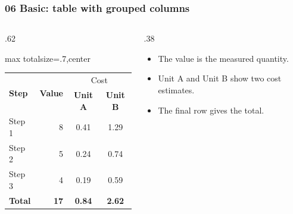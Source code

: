 \begin{frame}
    \frametitle{06 Basic: table with grouped columns}

    \begin{columns}[T]
        \begin{column}{.62\textwidth}
            \begin{adjustbox}{max totalsize={\textwidth}{.7\textheight},center}
                \begin{tabular}{l r cc}
                    \toprule
                    \multirow{2}{*}{\textbf{\alert{Step}}}
                        & \multirow{2}{*}{\textbf{\alert{Value}}}
                        & \multicolumn{2}{c}{\alert{Cost}} \\
                    & & \textbf{\alert{Unit A}} & \textbf{\alert{Unit B}} \\
                    \midrule
                    Step 1 & 8 & 0.41 & 1.29 \\
                    Step 2 & 5 & 0.24 & 0.74 \\
                    Step 3 & 4 & 0.19 & 0.59 \\
                    \midrule
                    \textbf{Total} & \textbf{17} & \textbf{0.84} & \textbf{2.62} \\
                    \bottomrule
                \end{tabular}
            \end{adjustbox}
        \end{column}
        \begin{column}{.38\textwidth}
            \begin{itemize}\setlength{\itemsep}{.8em}
                \item The value is the measured quantity.
                \item Unit A and Unit B show two cost estimates.
                \item The final row gives the total.
            \end{itemize}
        \end{column}
    \end{columns}
\end{frame}
